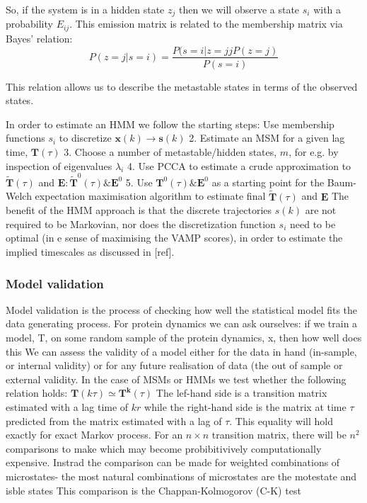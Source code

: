 So, if the system is in a hidden state $z_{j}$ then we will observe a state $s_{i}$ with a probability $E_{i j}$. This emission matrix is related to the membership matrix via Bayes' relation:
\begin{equation}
P(z=j | s=i)=\frac{P(s=i | z=j j P(z=j)}{P(s=i)}
\end{equation}

This relation allows us to describe the metastable states in terms of the observed states.

In order to estimate an HMM we follow the starting steps:
Use membership functions $s_{i}$ to discretize $\mathbf{x}(k) \rightarrow \mathbf{s}(k)$
2. Estimate an MSM for a given lag time, $\mathbf{T}(\tau)$
3. Choose a number of metastable/hidden states, $m$, for e.g. by inspection of eigenvalues $\lambda_{i}$
4. Use PCCA to estimate a crude approximation to $\tilde{\mathbf{T}}(\tau)$ and $\mathbf{E}: \tilde{\mathbf{T}}^{0}(\tau) \& \mathbf{E}^{0}$
5. Use $\mathbf{T}^{0}(\tau) \& \mathbf{E}^{0}$ as a starting point for the Baum-Welch expectation maximisation algorithm to estimate final $\widetilde{\mathbf{T}}(\tau)$ and $\mathbf{E}$
The benefit of the HMM approach is that the discrete trajectories $s(k)$ are not required to be Markovian, nor does the discretization function $s_{i}$ need to be optimal (in
e sense of maximising the VAMP scores), in order to estimate the implied timescales as discussed in [ref].



\subsubsection{Model validation}\label{sec:model_validation}

Model validation is the process of checking how well the statistical model fits the data generating process. For protein dynamics we can ask ourselves: if we train a model, T, on some random sample of the protein dynamics, x, then how well does this We can assess the validity of a model either for the data in hand (in-sample, or internal validity) or for any future realisation of data (the out of sample or external validity. In the case of MSMs or HMMs we test whether the following relation holds:
$\mathbf{T}(k \tau) \simeq \mathbf{T}^{\mathbf{k}}(\tau)$
The lef-hand side is a transition matrix estimated with a lag time of $k r$ while the right-hand side is the matrix at time $\tau$ predicted from the matrix estimated with a lag of $\tau$. This equality will hold exactly for exact Markov process. For an $n \times n$ transition matrix, there will be $n^{2}$ comparisons to make which may become probibitivively computationally expensive. Instrad the comparison can be made for weighted combinations of microstates- the most natural combinations of microstates are the motestate and isble states This comparison is the Chappan-Kolmogorov (C-K) test

